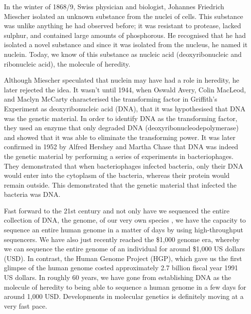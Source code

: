 \setlength{\parskip}{\baselineskip}%
\setlength{\parindent}{0pt}%

In the winter of 1868/9, Swiss physician and biologist, Johannes Friedrich Miescher isolated an unknown substance from the nuclei of cells\cite{dahm2008discovering}. This substance was unlike anything he had observed before; it was resistant to protease, lacked sulphur, and contained large amounts of phosphorous. He recognised that he had isolated a novel substance and since it was isolated from the nucleus, he named it nuclein. Today, we know of this substance as nucleic acid (deoxyribonucleic and ribonucleic acid), the molecule of heredity.

Although Miescher speculated that nuclein may have had a role in heredity, he later rejected the idea. It wasn't until 1944, when Oswald Avery, Colin MacLeod, and Maclyn McCarty characterised the transforming factor in Griffith's Experiment\cite{griffith1928significance} as deoxyribonucleic acid (DNA), that it was hypothesised that DNA was the genetic material\cite{avery1944studies}. In order to identify DNA as the transforming factor, they used an enzyme that only degraded DNA (deoxyribonucleodepolymerase) and showed that it was able to eliminate the transforming power. It was later confirmed in 1952 by Alfred Hershey and Martha Chase that DNA was indeed the genetic material by performing a series of experiments in bacteriophages\cite{hershey1952independent}. They demonstrated that when bacteriophages infected bacteria, only their DNA would enter into the cytoplasm of the bacteria, whereas their protein would remain outside. This demonstrated that the genetic material that infected the bacteria was DNA.

Fast forward to the 21st century and not only have we sequenced the entire collection of DNA, the genome, of our very own species \cite{venter2001sequence, lander2001initial}, we have the capacity to sequence an entire human genome in a matter of days by using high-throughput sequencers. We have also just recently reached the \$1,000 genome era, whereby we can sequence the entire genome of an individual for around \$1,000 US dollars (USD). In contrast, the Human Genome Project (HGP), which gave us the first glimpse of the human genome costed approximately 2.7 billion fiscal year 1991 US dollars\cite{nhgri2010cost}. In roughly 60 years, we have gone from establishing DNA as the molecule of heredity to being able to sequence a human genome in a few days for around 1,000 USD. Developments in molecular genetics is definitely moving at a very fast pace.

